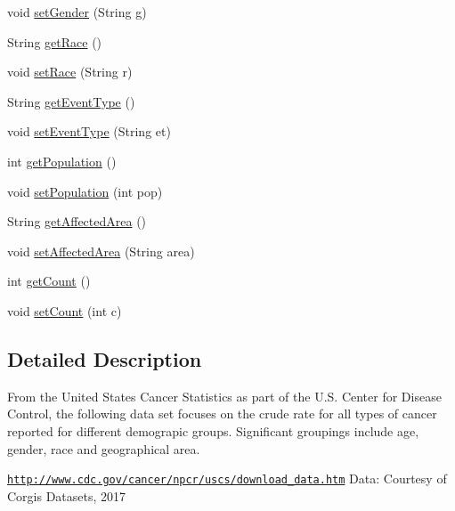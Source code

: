 \begin{DoxyCompactItemize}
void \hyperlink{classbridges_1_1data__src__dependent_1_1_cancer_incidence_a217681578e13197e1d177932c73ea80f}{set\+Gender} (String g)
\item 
String \hyperlink{classbridges_1_1data__src__dependent_1_1_cancer_incidence_a18de1c14d36cd7656555c8465ea8a009}{get\+Race} ()
\item 
void \hyperlink{classbridges_1_1data__src__dependent_1_1_cancer_incidence_a8c26c4358561453f3d2ca3a463eed872}{set\+Race} (String r)
\item 
String \hyperlink{classbridges_1_1data__src__dependent_1_1_cancer_incidence_a844c6c3317bdb6b124f32b40804e1ff7}{get\+Event\+Type} ()
\item 
void \hyperlink{classbridges_1_1data__src__dependent_1_1_cancer_incidence_a39338b20223e60b79fa38b3034ca46b7}{set\+Event\+Type} (String et)
\item 
int \hyperlink{classbridges_1_1data__src__dependent_1_1_cancer_incidence_a41c2507d46589080f6bb76ab29f53665}{get\+Population} ()
\item 
void \hyperlink{classbridges_1_1data__src__dependent_1_1_cancer_incidence_a9f1caf002b6573aa699a81ed1b835af0}{set\+Population} (int pop)
\item 
String \hyperlink{classbridges_1_1data__src__dependent_1_1_cancer_incidence_ad4c0c709fa5da9c0f20b648052db5f26}{get\+Affected\+Area} ()
\item 
void \hyperlink{classbridges_1_1data__src__dependent_1_1_cancer_incidence_a9c7f2d303da9498e5e6145439c5a6fbc}{set\+Affected\+Area} (String area)
\item 
int \hyperlink{classbridges_1_1data__src__dependent_1_1_cancer_incidence_a8769cb18ddb590dc41a04a220174f3df}{get\+Count} ()
\item 
void \hyperlink{classbridges_1_1data__src__dependent_1_1_cancer_incidence_a18099439ef6e35cf240b06f0e0158c72}{set\+Count} (int c)
\end{DoxyCompactItemize}


\subsection{Detailed Description}
From the United States Cancer Statistics as part of the U.\+S. Center for Disease Control, the following data set focuses on the crude rate for all types of cancer reported for different demograpic groups. Significant groupings include age, gender, race and geographical area.

\href{http://www.cdc.gov/cancer/npcr/uscs/download_data.htm}{\tt http\+://www.\+cdc.\+gov/cancer/npcr/uscs/download\+\_\+data.\+htm} Data\+: Courtesy of Corgis Datasets, 2017

